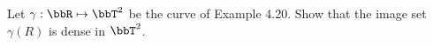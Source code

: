 Let $\gamma:\bbR \mapsto \bbT^2$ be the curve of Example 4.20. Show that the image set $\gamma(R)$ is dense in $\bbT^2$.